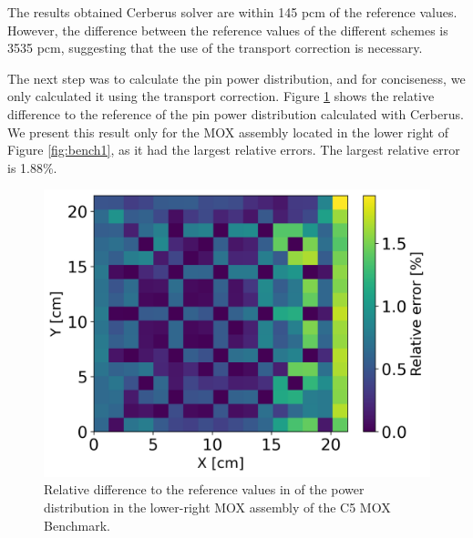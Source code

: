 \documentclass{anstrans}
\begin{document}
The results obtained Cerberus solver are within 145 pcm of the reference values.
However, the difference between the reference values of the different schemes is 3535 pcm, suggesting that the use of the transport correction is necessary.

The next step was to calculate the pin power distribution, and for conciseness, we only calculated it using the transport correction.
Figure \ref{fig:power-pbp} shows the relative difference to the reference of the pin power distribution calculated with Cerberus.
We present this result only for the MOX assembly located in the lower right of Figure \ref{fig:bench1}, as it had the largest relative errors.
The largest relative error is 1.88\%.

\begin{figure}[h] %
    \centering
    \includegraphics[width=0.75\linewidth]{figures/mox-r-pin-by-pin.png}
    \hfill
    \caption{Relative difference to the reference values in \cite{cavarec_benchmark_1994} of the power distribution in the lower-right MOX assembly of the C5 MOX Benchmark.}
    \label{fig:power-pbp}
\end{figure}



\end{document}
